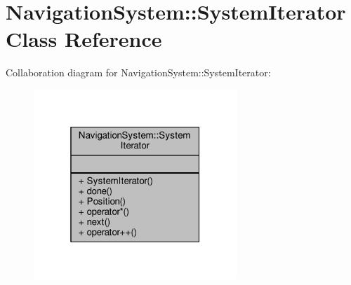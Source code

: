 \hypertarget{classNavigationSystem_1_1SystemIterator}{}\section{Navigation\+System\+:\+:System\+Iterator Class Reference}
\label{classNavigationSystem_1_1SystemIterator}


Collaboration diagram for Navigation\+System\+:\+:System\+Iterator\+:
\nopagebreak
\begin{figure}[H]
\begin{center}
\leavevmode
\includegraphics[width=217pt]{d6/d93/classNavigationSystem_1_1SystemIterator__coll__graph}
\end{center}
\end{figure}
